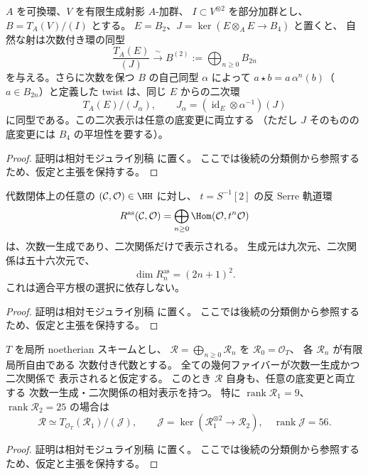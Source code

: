 \begin{lemma}
\label{lem:relative-quadratic-veronese}
$A$ を可換環、$V$ を有限生成射影 $A$-加群、
$I\subset V^{\otimes2}$ を部分加群とし、
$B=T_A(V)/(I)$ とする。
$E=B_2$、$J=\ker(E\otimes_AE\to B_4)$ と置くと、
自然な射は次数付き環の同型
\[
 \frac{T_A(E)}{(J)}
    \xrightarrow{\ \sim\ } B^{(2)}
    :=\bigoplus_{n\ge0}B_{2n}
 \tag{QV}\label{eq:relative-quadratic-veronese}
\]
を与える。さらに次数を保つ $B$ の自己同型 $\alpha$ によって
$a\star b=a\,\alpha^n(b)$（$a\in B_{2n}$）と定義した
twist は、同じ $E$ からの二次環
\[
 T_A(E)/(J_\alpha),\qquad
 J_\alpha=(\operatorname{id}_E\otimes\alpha^{-1})(J)
\]
に同型である。この二次表示は任意の底変更に両立する
（ただし $J$ そのものの底変更には $B_4$ の平坦性を要する）。
\end{lemma}
\begin{proof}
証明は相対モジュライ別稿 \cite[\texttt{foundation_stack} 節]{QuadricModuli2026} に置く。
ここでは後続の分類側から参照するため、仮定と主張を保持する。
\end{proof}

\begin{corollary}
\label{cor:h2-intrinsic-antiserre-quadratic}
代数閉体上の任意の $(\mathcal C,\mathcal O)\in\HH$ に対し、
$t=S^{-1}[2]$ の反 Serre 軌道環
\[
 R^{\mathrm{as}}(\mathcal C,\mathcal O)
 =\bigoplus_{n\ge0}\Hom(\mathcal O,t^n\mathcal O)
\]
は、次数一生成であり、二次関係だけで表示される。
生成元は九次元、二次関係は五十六次元で、
\[
 \dim R^{\mathrm{as}}_n=(2n+1)^2.
\]
これは適合平方根の選択に依存しない。
\end{corollary}
\begin{proof}
証明は相対モジュライ別稿 \cite[\texttt{foundation_stack} 節]{QuadricModuli2026} に置く。
ここでは後続の分類側から参照するため、仮定と主張を保持する。
\end{proof}

\begin{lemma}[体上で二次なら全平坦族でも二次]
\label{lem:relative-quadratic-from-fibers}
$T$ を局所 noetherian スキームとし、
$\mathcal R=\bigoplus_{n\ge0}\mathcal R_n$ を
$\mathcal R_0=\mathcal O_T$、
各 $\mathcal R_n$ が有限局所自由である
次数付き代数とする。
全ての幾何ファイバーが次数一生成かつ二次関係で
表示されると仮定する。
このとき $\mathcal R$ 自身も、任意の底変更と両立する
次数一生成・二次関係の相対表示を持つ。
特に $\operatorname{rank}\mathcal R_1=9$、
$\operatorname{rank}\mathcal R_2=25$ の場合は
\[
 \mathcal R\simeq
 T_{\mathcal O_T}(\mathcal R_1)/(\mathcal J),
 \qquad
 \mathcal J=\ker(\mathcal R_1^{\otimes2}\to\mathcal R_2),
 \quad\operatorname{rank}\mathcal J=56.
 \tag{flat-Q}\label{eq:relative-quadratic-from-fibers}
\]
\end{lemma}
\begin{proof}
証明は相対モジュライ別稿 \cite[\texttt{foundation_stack} 節]{QuadricModuli2026} に置く。
ここでは後続の分類側から参照するため、仮定と主張を保持する。
\end{proof}

